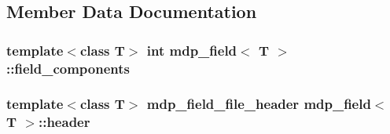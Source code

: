 \subsection{Member Data Documentation}
\hypertarget{classmdp__field_a090b0995fcfb15a9e9258b5721b685ba}{
\subsubsection[{field\_\-components}]{\setlength{\rightskip}{0pt plus 5cm}template$<$class T$>$ int {\bf mdp\_\-field}$<$ T $>$::{\bf field\_\-components}}}
\label{classmdp__field_a090b0995fcfb15a9e9258b5721b685ba}
\hypertarget{classmdp__field_a465dfc6a95fe7ca5016595550cd024d9}{
\subsubsection[{header}]{\setlength{\rightskip}{0pt plus 5cm}template$<$class T$>$ {\bf mdp\_\-field\_\-file\_\-header} {\bf mdp\_\-field}$<$ T $>$::{\bf header}}}
\label{classmdp__field_a465dfc6a95fe7ca5016595550cd024d9}


